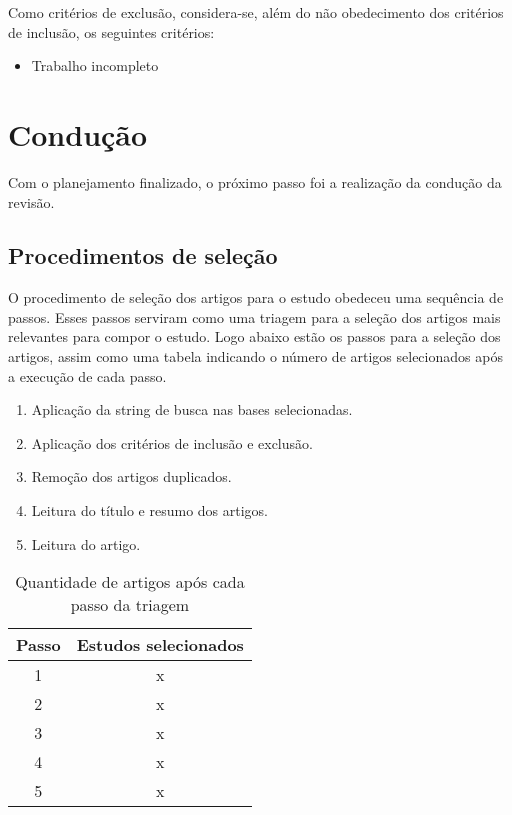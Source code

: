 Como critérios de exclusão, considera-se, além do não obedecimento dos critérios de inclusão, os seguintes critérios:
\begin{itemize}
	\item Trabalho incompleto
\end{itemize}

\section{Condução}

Com o planejamento finalizado, o próximo passo foi a realização da condução da revisão.

\subsection{Procedimentos de seleção}

O procedimento de seleção dos artigos para o estudo obedeceu uma sequência de passos. Esses passos serviram como uma triagem para a seleção dos artigos mais relevantes para compor o estudo. Logo abaixo estão os passos para a seleção dos artigos, assim como uma tabela indicando o número de artigos selecionados após a execução de cada passo.

\begin{enumerate}
	\item Aplicação da string de busca nas bases selecionadas. %
	
	\item Aplicação dos critérios de inclusão e exclusão. %
	
	\item Remoção dos artigos duplicados. %
	
	\item Leitura do título e resumo dos artigos. %
	
	\item Leitura do artigo. %
\end{enumerate} 

\begin{table}[h!]
	\centering
	\label{tab:triagem}
	\begin{tabular}{|c|c|}
		\hline
		\textbf{Passo} & \textbf{Estudos selecionados} \\ \hline
		1 & x \\ \hline
		2 & x \\ \hline
		3 & x \\ \hline
		4 & x \\ \hline
		5 & x \\ \hline
	\end{tabular}
	\caption{Quantidade de artigos após cada passo da triagem}
\end{table}

